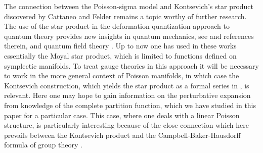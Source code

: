 \documentclass[a4paper,twoside,11pt]{article}
\numberwithin{equation}{section}
\begin{document}
The connection between the Poisson-sigma model and Kontsevich's star product discovered by Cattaneo and Felder \cite{CF1} remains a topic worthy of further research. The use of the star product in the deformation quantization approach to quantum theory provides new insights in quantum mechanics, see
\cite{HH} and references therein, and quantum field theory \cite{DF}. Up to now one has used in these works essentially the Moyal star product, which is limited to functions defined on symplectic manifolds. To treat gauge theories in this approach it will be necessary to work in the more general context of Poisson manifolds, in which case the Kontsevich construction, which yields the star product as a formal series in \myHighlight{$\hbar$}\coordHE{}, is relevant. Here one may hope to gain information on the perturbative expansion from knowledge of the complete partition function, which we have studied in this paper for a particular case. This case, where one deals with a linear Poisson structure, is particularly interesting because of the close connection which here prevails between the Kontsevich product and the Campbell-Baker-Hausdorff formula of group theory \cite{KT}.  
\bigskip\\
%
\end{document}
